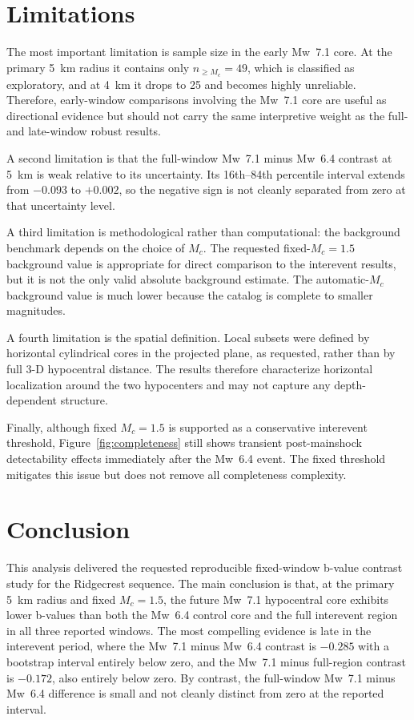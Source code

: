 \documentclass[11pt]{article}
\begin{document}
\section{Limitations}
The most important limitation is sample size in the early Mw~7.1 core. At the primary 5~km radius it contains only $n_{\ge M_c}=49$, which is classified as exploratory, and at 4~km it drops to 25 and becomes highly unreliable. Therefore, early-window comparisons involving the Mw~7.1 core are useful as directional evidence but should not carry the same interpretive weight as the full- and late-window robust results.

A second limitation is that the full-window Mw~7.1 minus Mw~6.4 contrast at 5~km is weak relative to its uncertainty. Its 16th--84th percentile interval extends from $-0.093$ to $+0.002$, so the negative sign is not cleanly separated from zero at that uncertainty level.

A third limitation is methodological rather than computational: the background benchmark depends on the choice of $M_c$. The requested fixed-$M_c=1.5$ background value is appropriate for direct comparison to the interevent results, but it is not the only valid absolute background estimate. The automatic-$M_c$ background value is much lower because the catalog is complete to smaller magnitudes.

A fourth limitation is the spatial definition. Local subsets were defined by horizontal cylindrical cores in the projected plane, as requested, rather than by full 3-D hypocentral distance. The results therefore characterize horizontal localization around the two hypocenters and may not capture any depth-dependent structure.

Finally, although fixed $M_c=1.5$ is supported as a conservative interevent threshold, Figure~\ref{fig:completeness} still shows transient post-mainshock detectability effects immediately after the Mw~6.4 event. The fixed threshold mitigates this issue but does not remove all completeness complexity.

\section{Conclusion}
This analysis delivered the requested reproducible fixed-window b-value contrast study for the Ridgecrest sequence. The main conclusion is that, at the primary 5~km radius and fixed $M_c=1.5$, the future Mw~7.1 hypocentral core exhibits lower b-values than both the Mw~6.4 control core and the full interevent region in all three reported windows. The most compelling evidence is late in the interevent period, where the Mw~7.1 minus Mw~6.4 contrast is $-0.285$ with a bootstrap interval entirely below zero, and the Mw~7.1 minus full-region contrast is $-0.172$, also entirely below zero. By contrast, the full-window Mw~7.1 minus Mw~6.4 difference is small and not cleanly distinct from zero at the reported interval.
\end{document}
